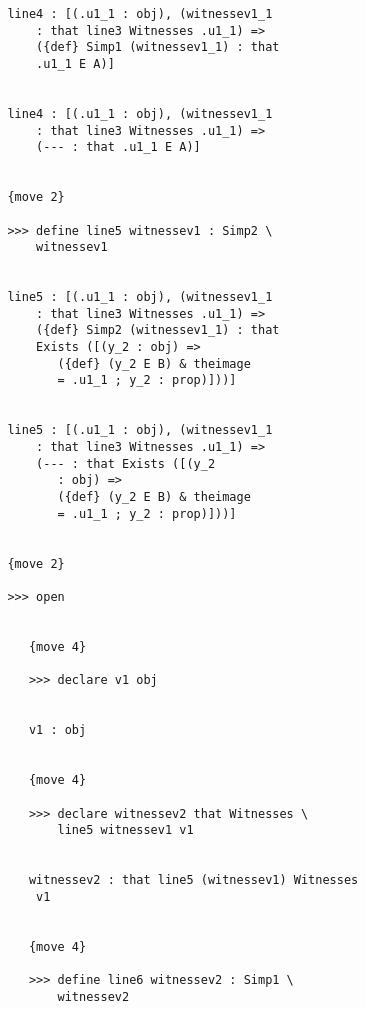 \documentclass[12pt]{article}
\begin{document}
\begin{verbatim}
         line4 : [(.u1_1 : obj), (witnessev1_1 
             : that line3 Witnesses .u1_1) => 
             ({def} Simp1 (witnessev1_1) : that 
             .u1_1 E A)]


         line4 : [(.u1_1 : obj), (witnessev1_1 
             : that line3 Witnesses .u1_1) => 
             (--- : that .u1_1 E A)]


         {move 2}

         >>> define line5 witnessev1 : Simp2 \
             witnessev1


         line5 : [(.u1_1 : obj), (witnessev1_1 
             : that line3 Witnesses .u1_1) => 
             ({def} Simp2 (witnessev1_1) : that 
             Exists ([(y_2 : obj) => 
                ({def} (y_2 E B) & theimage 
                = .u1_1 ; y_2 : prop)]))]


         line5 : [(.u1_1 : obj), (witnessev1_1 
             : that line3 Witnesses .u1_1) => 
             (--- : that Exists ([(y_2 
                : obj) => 
                ({def} (y_2 E B) & theimage 
                = .u1_1 ; y_2 : prop)]))]


         {move 2}

         >>> open


            {move 4}

            >>> declare v1 obj


            v1 : obj


            {move 4}

            >>> declare witnessev2 that Witnesses \
                line5 witnessev1 v1


            witnessev2 : that line5 (witnessev1) Witnesses 
             v1


            {move 4}

            >>> define line6 witnessev2 : Simp1 \
                witnessev2


\end{verbatim}
\end{document}

